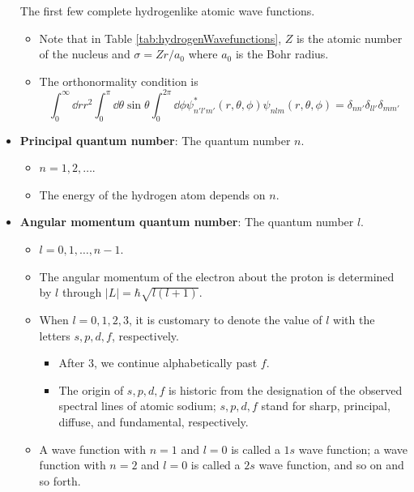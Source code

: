 \documentclass[../notes.tex]{subfiles}
\begin{document}
\begin{itemize}
\begin{table}[h!]
        \caption{The first few complete hydrogenlike atomic wave functions.}
        \label{tab:hydrogenWavefunctions}
    \end{table}
    \begin{itemize}
        \item Note that in Table \ref{tab:hydrogenWavefunctions}, $Z$ is the atomic number of the nucleus and $\sigma=Zr/a_0$ where $a_0$ is the Bohr radius.
        \item The orthonormality condition is
        \begin{equation*}
            \int_0^\infty\dd{r}r^2\int_0^\pi\dd{\theta}\sin\theta\int_0^{2\pi}\dd{\phi}\psi_{n'l'm'}^*(r,\theta,\phi)\psi_{nlm}(r,\theta,\phi) = \delta_{nn'}\delta_{ll'}\delta_{mm'}
        \end{equation*}
    \end{itemize}
    \item \textbf{Principal quantum number}: The quantum number $n$.
    \begin{itemize}
        \item $n=1,2,\dots$.
        \item The energy of the hydrogen atom depends on $n$.
    \end{itemize}
    \item \textbf{Angular momentum quantum number}: The quantum number $l$.
    \begin{itemize}
        \item $l=0,1,\dots,n-1$.
        \item The angular momentum of the electron about the proton is determined by $l$ through $|L|=\hbar\sqrt{l(l+1)}$.
        \item When $l=0,1,2,3$, it is customary to denote the value of $l$ with the letters $s,p,d,f$, respectively.
        \begin{itemize}
            \item After 3, we continue alphabetically past $f$.
            \item The origin of $s,p,d,f$ is historic from the designation of the observed spectral lines of atomic sodium; $s,p,d,f$ stand for sharp, principal, diffuse, and fundamental, respectively.
        \end{itemize}
        \item A wave function with $n=1$ and $l=0$ is called a $1s$ wave function; a wave function with $n=2$ and $l=0$ is called a $2s$ wave function, and so on and so forth.
    \end{itemize}

\end{itemize}
\end{document}
